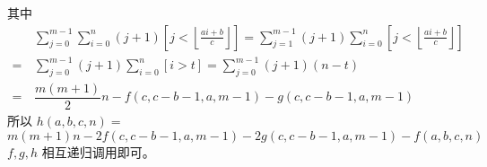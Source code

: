 \documentclass[UTF8]{beamer}
\begin{document}
    \begin{frame}
其中
$$
\begin{aligned}
&\sum_{j=0}^{m-1}\sum_{i=0}^n (j+1)\left[j< \left\lfloor \frac{ai+b}{c}\right\rfloor\right]=\sum_{j=1}^{m-1}(j+1)\sum_{i=0}^n \left[j< \left\lfloor \frac{ai+b}{c}\right\rfloor\right]\\
=\,&\sum_{j=0}^{m-1}(j+1)\sum_{i=0}^n[i>t]=\sum_{j=0}^{m-1}(j+1)(n-t)\\
=\,&\dfrac{m(m+1)}{2}n-f(c,c-b-1,a,m-1) -g(c,c-b-1,a,m-1)
\end{aligned}
$$
所以 $h(a,b,c,n)=$
$$
m(m+1)n-2f(c,c-b-1,a,m-1)-2g(c,c-b-1,a,m-1)-f(a,b,c,n)
$$
\pause
$f,g,h$ 相互递归调用即可。
    \end{frame}

    
        
        
        
\end{document}
